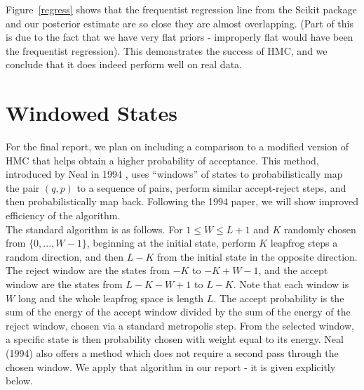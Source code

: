 \documentclass{article}
\numberwithin{equation}{section}
\begin{document}
Figure~\ref{regress} shows that the frequentist regression line from the Scikit package and our posterior estimate are so close they are almost overlapping. (Part of this is due to the fact that we have very flat priors - improperly flat would have been the frequentist regression). This demonstrates the success of HMC, and we conclude that it does indeed perform well on real data.


\section{Windowed States}
For the final report, we plan on including a comparison to a modified version of HMC that helps obtain a higher probability of acceptance. This method, introduced by Neal in 1994 \cite{neal_94}, uses ``windows'' of states to probabilistically map the pair $(q,p)$ to a sequence of pairs, perform similar accept-reject steps, and then probabilistically map back. Following the 1994 paper, we will show improved efficiency of the algorithm.\\

The standard algorithm is as follows. For $1 \leq W \leq L + 1$ and $K$ randomly chosen from $\{0,...,W-1\}$, beginning at the initial state, perform $K$ leapfrog steps a random direction, and then $L - K$ from the initial state in the opposite direction. The reject window are the states from $-K$ to $-K + W - 1$, and the accept window are the states from $L-K-W+1$ to $L-K$. Note that each window is $W$ long and the whole leapfrog space is length $L$. The accept probability is the sum of the energy of the accept window divided by the sum of the energy of the reject window, chosen via a standard metropolis step. From the selected window, a specific state is then probability chosen with weight equal to its energy. Neal (1994)\cite{neal_94} also offers a method which does not require a second pass through the chosen window. We apply that algorithm in our report - it is given explicitly below.\\
\end{document}
